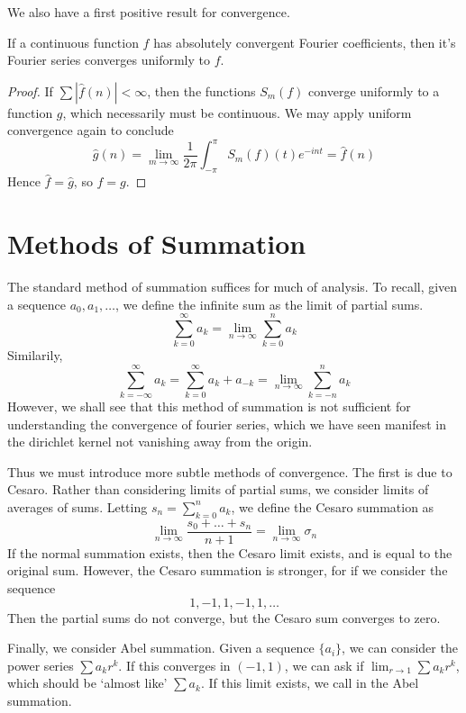 We also have a first positive result for convergence.

\begin{corollary}
    If a continuous function $f$ has absolutely convergent Fourier coefficients, then it's Fourier series converges uniformly to $f$.
\end{corollary}
\begin{proof}
    If $\sum |\hat{f}(n)| < \infty$, then the functions $S_m(f)$ converge uniformly to a function $g$, which necessarily must be continuous. We may apply uniform convergence again to conclude
    \[ \hat{g}(n) = \lim_{m \to \infty} \frac{1}{2\pi} \int_{-\pi}^\pi S_m(f)(t) e^{-int} = \hat{f}(n) \]
    Hence $\hat{f} = \hat{g}$, so $f = g$.
\end{proof}

\section{Methods of Summation}

The standard method of summation suffices for much of analysis. To recall, given a sequence $a_0, a_1, \dots$, we define the infinite sum as the limit of partial sums.
%
\[ \sum_{k = 0}^\infty a_k = \lim_{n \to \infty} \sum_{k = 0}^n a_k \]
%
Similarily,
%
\[ \sum_{k = -\infty}^\infty a_k = \sum_{k = 0}^\infty a_k + a_{-k} = \lim_{n \to \infty} \sum_{k = -n}^n a_k \]
%
However, we shall see that this method of summation is not sufficient for understanding the convergence of fourier series, which we have seen manifest in the dirichlet kernel not vanishing away from the origin.

Thus we must introduce more subtle methods of convergence. The first is due to Cesaro. Rather than considering limits of partial sums, we consider limits of averages of sums. Letting $s_n = \sum_{k = 0}^n a_k$, we define the Cesaro summation as
%
\[ \lim_{n \to \infty} \frac{s_0 + \dots + s_n}{n+1} = \lim_{n \to \infty} \sigma_n \]
%
If the normal summation exists, then the Cesaro limit exists, and is equal to the original sum. However, the Cesaro summation is stronger, for if we consider the sequence
%
\[ 1,-1,1,-1,1,\dots \]
%
Then the partial sums do not converge, but the Cesaro sum converges to zero.

Finally, we consider Abel summation. Given a sequence $\{ a_i \}$, we can consider the power series $\sum a_k r^k$. If this converges in $(-1,1)$, we can ask if $\lim_{r \to 1} \sum a_k r^k$, which should be `almost like' $\sum a_k$. If this limit exists, we call in the Abel summation.

